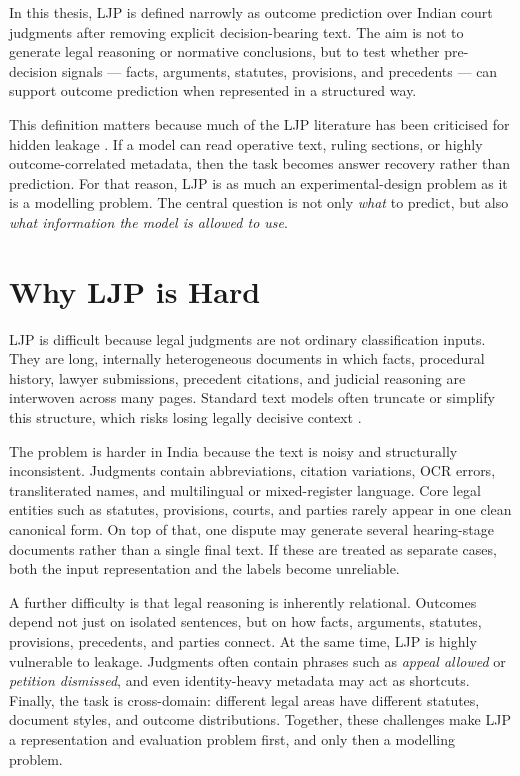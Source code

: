 In this thesis, LJP is defined narrowly as outcome prediction over Indian court judgments after removing explicit decision-bearing text. The aim is not to generate legal reasoning or normative conclusions, but to test whether pre-decision signals --- facts, arguments, statutes, provisions, and precedents --- can support outcome prediction when represented in a structured way.

This definition matters because much of the LJP literature has been criticised for hidden leakage \cite{medvedeva2023doitright}. If a model can read operative text, ruling sections, or highly outcome-correlated metadata, then the task becomes answer recovery rather than prediction. For that reason, LJP is as much an experimental-design problem as it is a modelling problem. The central question is not only \emph{what} to predict, but also \emph{what information the model is allowed to use}. 

\section{Why LJP is Hard}

LJP is difficult because legal judgments are not ordinary classification inputs. They are long, internally heterogeneous documents in which facts, procedural history, lawyer submissions, precedent citations, and judicial reasoning are interwoven across many pages. Standard text models often truncate or simplify this structure, which risks losing legally decisive context \cite{chalkidis2020legalbert, mamakas2022longlegal}.

The problem is harder in India because the text is noisy and structurally inconsistent. Judgments contain abbreviations, citation variations, OCR errors, transliterated names, and multilingual or mixed-register language. Core legal entities such as statutes, provisions, courts, and parties rarely appear in one clean canonical form. On top of that, one dispute may generate several hearing-stage documents rather than a single final text. If these are treated as separate cases, both the input representation and the labels become unreliable.

A further difficulty is that legal reasoning is inherently relational. Outcomes depend not just on isolated sentences, but on how facts, arguments, statutes, provisions, precedents, and parties connect. At the same time, LJP is highly vulnerable to leakage. Judgments often contain phrases such as \emph{appeal allowed} or \emph{petition dismissed}, and even identity-heavy metadata may act as shortcuts. Finally, the task is cross-domain: different legal areas have different statutes, document styles, and outcome distributions. Together, these challenges make LJP a representation and evaluation problem first, and only then a modelling problem.

